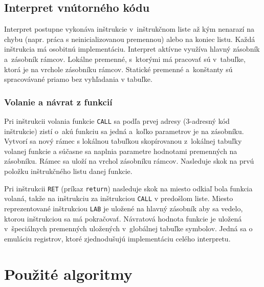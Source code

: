 \documentclass[11pt,a4paper]{article}
\begin{document}

	\subsection{Interpret vnútorného kódu}
	\label{interpret}
	Interpret postupne vykonáva inštrukcie v~inštrukčnom liste až kým nenarazí
	na chybu (napr. práca s neinicializovanou premennou) alebo na koniec listu.
	Každá inštrukcia má osobitnú implementáciu. Interpret aktívne využíva hlavný
	zásobník a~zásobník rámcov. Lokálne premenné, s~ktorými má pracovať  sú v~tabuľke,
	ktorá je na vrchole zásobníku rámcov. Statické premenné a~konštanty sú spracovávané
	priamo bez vyhľadania v tabuľke.

	\subsubsection{Volanie a návrat z funkcií}
	\label{funkcia}
	Pri inštrukcii volania funkcie \texttt{CALL} sa podľa prvej adresy
	(3-adresný kód inštrukcie) zistí o~akú funkciu sa jedná a~koľko parametrov
	je na zásobníku. Vytvorí sa nový rámec s lokálnou tabuľkou skopírovanou
	z~lokálnej tabuľky volanej funkcie a súčasne sa naplnia parametre
	hodnotami premenných na zásobníku. Rámec sa uloží na vrchol zásobníku rámcov.
	Nasleduje skok na prvú položku inštrukčného listu danej funkcie.


	Pri inštrukcii \texttt{RET} (príkaz \texttt{return}) nasleduje skok na
	miesto odkiaľ bola funkcia volaná, takže na inštrukciu za inštrukciou
	\texttt{CALL} v predošlom liste. Miesto reprezentované inštrukciou
	\texttt{LAB} %
    je uložené na hlavný zásobník aby sa vedelo, ktorou inštrukciou
	sa má pokračovať. Návratová hodnota funkcie je uložená v~špeciálnych
	premenných uložených v~globálnej tabuľke symbolov. Jedná sa o emuláciu
	registrov, ktoré zjednodušujú implementáciu celého interpretu.




	\section{Použité algoritmy}
	\label{algoritmy}
\end{document}
